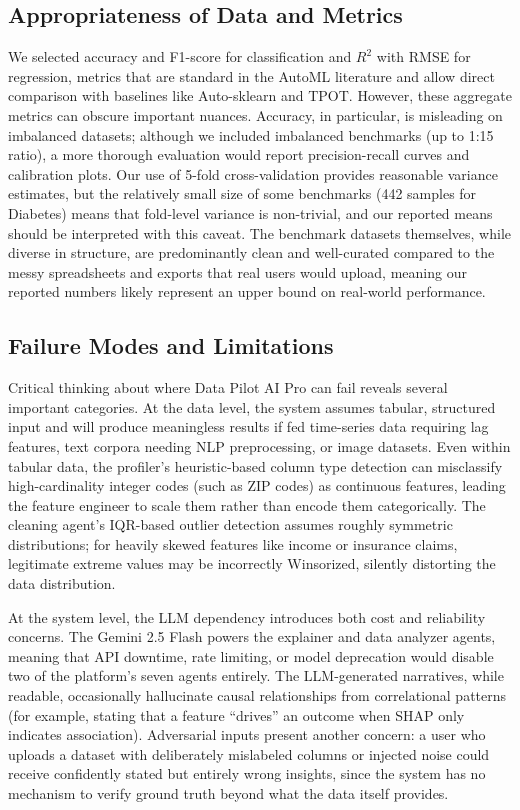 \documentclass{article}
\begin{document}
\subsection{Appropriateness of Data and Metrics}

We selected accuracy and F1-score for classification and $R^2$ with RMSE for regression, metrics that are standard in the AutoML literature and allow direct comparison with baselines like Auto-sklearn and TPOT. However, these aggregate metrics can obscure important nuances. Accuracy, in particular, is misleading on imbalanced datasets; although we included imbalanced benchmarks (up to 1:15 ratio), a more thorough evaluation would report precision-recall curves and calibration plots. Our use of 5-fold cross-validation provides reasonable variance estimates, but the relatively small size of some benchmarks (442 samples for Diabetes) means that fold-level variance is non-trivial, and our reported means should be interpreted with this caveat. The benchmark datasets themselves, while diverse in structure, are predominantly clean and well-curated compared to the messy spreadsheets and exports that real users would upload, meaning our reported numbers likely represent an upper bound on real-world performance.

\subsection{Failure Modes and Limitations}

Critical thinking about where Data Pilot AI Pro can fail reveals several important categories. At the data level, the system assumes tabular, structured input and will produce meaningless results if fed time-series data requiring lag features, text corpora needing NLP preprocessing, or image datasets. Even within tabular data, the profiler's heuristic-based column type detection can misclassify high-cardinality integer codes (such as ZIP codes) as continuous features, leading the feature engineer to scale them rather than encode them categorically. The cleaning agent's IQR-based outlier detection assumes roughly symmetric distributions; for heavily skewed features like income or insurance claims, legitimate extreme values may be incorrectly Winsorized, silently distorting the data distribution.

At the system level, the LLM dependency introduces both cost and reliability concerns. The Gemini 2.5 Flash powers the explainer and data analyzer agents, meaning that API downtime, rate limiting, or model deprecation would disable two of the platform's seven agents entirely. The LLM-generated narratives, while readable, occasionally hallucinate causal relationships from correlational patterns (for example, stating that a feature ``drives'' an outcome when SHAP only indicates association). Adversarial inputs present another concern: a user who uploads a dataset with deliberately mislabeled columns or injected noise could receive confidently stated but entirely wrong insights, since the system has no mechanism to verify ground truth beyond what the data itself provides.
\end{document}
